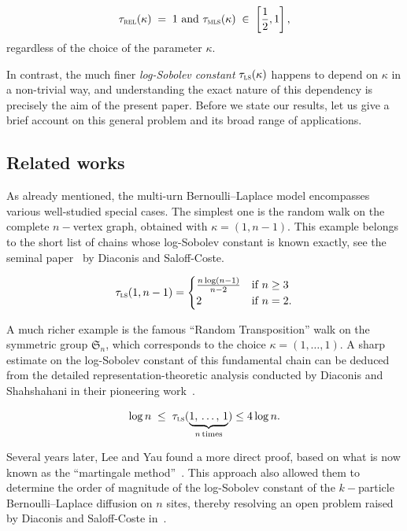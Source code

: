 \documentclass[AHL,Unicode,longabstracts,published]{cedram}
\newcommand{\frkS}{\mathfrak{S}}
\newcommand{\trel}{\tau_{\textsc{rel}}}
\newcommand{\tmls}{\tau_{\textsc{mls}}}
\newcommand{\tls}{\tau_{\textsc{ls}}}
\begin{document}
\begin{lemm} \label{pr:insensitive}
\[
\trel(\kappa) \; = \; 1 \text{ and } \tmls(\kappa) \; \in \; \left[\frac{1}{2},1\right],
\]
regardless of the choice of the parameter $\kappa$.
\end{lemm}

In contrast, the much finer \emph{log-Sobolev constant} $\tls(\kappa)$ happens to depend on $\kappa$ in a non-trivial way, and understanding the exact nature of this dependency is precisely the aim of the present paper. Before we state our results, let us give a brief account on this general problem and its broad range of applications.



\subsection{Related works}

As already mentioned, the multi-urn Bernoulli--Laplace model encompasses various well-studied special cases. The simplest one is the random walk on the complete $n-$vertex graph, obtained with $\kappa=(1,n-1)$. This example belongs to the short list of chains whose log-Sobolev constant is known exactly, see the seminal paper~\cite{MR1410112} by Diaconis and Saloff-Coste.
\begin{theo} \label{th:RW}
\[
\tls(1,n-1)  =  
\begin{cases}
\frac{n\log(n-1)}{n-2} & \text{if }n\ge 3\\
2 & \text{if }n=2.
\end{cases}
\]
\end{theo}


A much richer example is the famous ``Random Transposition'' walk on the symmetric group ${\frkS}_n$, which corresponds to the choice $\kappa=(1,\ldots,1)$. A sharp estimate on the log-Sobolev constant of this fundamental chain can be deduced from the detailed representation-theoretic analysis conducted by Diaconis and Shahshahani in their pioneering work~\cite{MR626813}.


\begin{theo}\label{th:RT}
\[
\log n\; \le \; \tls(\underbrace{1,\,\ldots,\,1}_{n\,\text{times}}) \le 4\log n.
\]
\end{theo}

Several years later, Lee and Yau found a more direct proof, based on what is now known as the ``martingale method''~\cite{MR1675008}. This approach also allowed them to determine the order of magnitude of the log-Sobolev constant of the $k-$particle Bernoulli--Laplace diffusion on $n$ sites, thereby resolving an open problem raised by Diaconis and Saloff-Coste in~\cite{MR1410112}.
\end{document}
